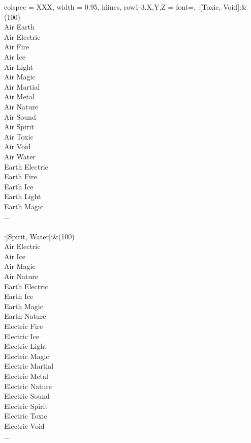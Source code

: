 \begin{longtblr}[
	caption = {2v2 Defending Weak},
	label = {2v2-Defending-Weak},
]{
	colspec = {XXX}, width = 0.95\linewidth,
	hlines,
	row{1-3,X,Y,Z} = {font=\bfseries},
}
	:[Toxic, Void]:&{(100)\\
	Air Earth \\
	Air Electric \\
	Air Fire \\
	Air Ice \\
	Air Light \\
	Air Magic \\
	Air Martial \\
	Air Metal \\
	Air Nature \\
	Air Sound \\
	Air Spirit \\
	Air Toxic \\
	Air Void \\
	Air Water \\
	Earth Electric \\
	Earth Fire \\
	Earth Ice \\
	Earth Light \\
	Earth Magic \\
	...\\
	}\\

	:[Spirit, Water]:&{(100)\\
	Air Electric \\
	Air Ice \\
	Air Magic \\
	Air Nature \\
	Earth Electric \\
	Earth Ice \\
	Earth Magic \\
	Earth Nature \\
	Electric Fire \\
	Electric Ice \\
	Electric Light \\
	Electric Magic \\
	Electric Martial \\
	Electric Metal \\
	Electric Nature \\
	Electric Sound \\
	Electric Spirit \\
	Electric Toxic \\
	Electric Void \\
	...\\
	}\\


\end{longtblr}
